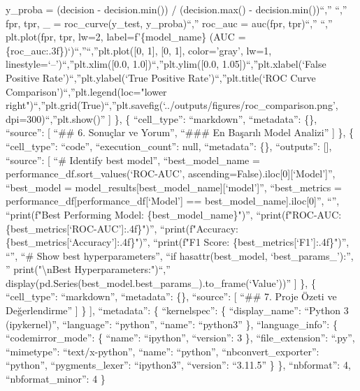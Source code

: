 \documentclass[11pt]{article}
\begin{document}
y\_proba = (decision - decision.min()) / (decision.max() -
decision.min())\n``,'' \n``,'' fpr, tpr, \_ = roc\_curve(y\_test,
y\_proba)\n``,'' roc\_auc = auc(fpr, tpr)\n``,'' \n``,'' plt.plot(fpr,
tpr, lw=2, label=f'\{model\_name\} (AUC =
\{roc\_auc:.3f\})`)\n``,''\n``,''plt.plot({[}0, 1{]}, {[}0, 1{]},
color='gray', lw=1, linestyle=`--')\n``,''plt.xlim({[}0.0,
1.0{]})\n``,''plt.ylim({[}0.0, 1.05{]})\n``,''plt.xlabel(`False Positive
Rate')\n``,''plt.ylabel(`True Positive Rate')\n``,''plt.title(`ROC Curve
Comparison')\n``,''plt.legend(loc="lower
right")\n``,''plt.grid(True)\n``,''plt.savefig(`../outputs/figures/roc\_comparison.png',
dpi=300)\n``,''plt.show()'' {]} \}, \{ ``cell\_type'': ``markdown'',
``metadata'': \{\}, ``source'': {[} ``\#\# 6. Sonuçlar ve Yorum\n'',
``\#\#\# En Başarılı Model Analizi'' {]} \}, \{ ``cell\_type'':
``code'', ``execution\_count'': null, ``metadata'': \{\}, ``outputs'':
{[}{]}, ``source'': {[} ``\# Identify best model\n'',
``best\_model\_name = performance\_df.sort\_values(`ROC-AUC',
ascending=False).iloc{[}0{]}{[}`Model'{]}\n'', ``best\_model =
model\_results{[}best\_model\_name{]}{[}`model'{]}\n'', ``best\_metrics
= performance\_df{[}performance\_df{[}`Model'{]} ==
best\_model\_name{]}.iloc{[}0{]}\n'', ``\n'', ``print(f"Best Performing
Model: \{best\_model\_name\}")\n'', ``print(f"ROC-AUC:
\{best\_metrics{[}`ROC-AUC'{]}:.4f\}")\n'', ``print(f"Accuracy:
\{best\_metrics{[}`Accuracy'{]}:.4f\}")\n'', ``print(f"F1 Score:
\{best\_metrics{[}`F1'{]}:.4f\}")\n'', ``\n'', ``\# Show best
hyperparameters\n'', ``if hasattr(best\_model, `best\_params\_'):\n'',
'' print("\textbackslash nBest Hyperparameters:")\n``,''
display(pd.Series(best\_model.best\_params\_).to\_frame(`Value'))'' {]}
\}, \{ ``cell\_type'': ``markdown'', ``metadata'': \{\}, ``source'': {[}
``\#\# 7. Proje Özeti ve Değerlendirme'' {]} \} {]}, ``metadata'': \{
``kernelspec'': \{ ``display\_name'': ``Python 3 (ipykernel)'',
``language'': ``python'', ``name'': ``python3'' \}, ``language\_info'':
\{ ``codemirror\_mode'': \{ ``name'': ``ipython'', ``version'': 3 \},
``file\_extension'': ``.py'', ``mimetype'': ``text/x-python'', ``name'':
``python'', ``nbconvert\_exporter'': ``python'', ``pygments\_lexer'':
``ipython3'', ``version'': ``3.11.5'' \} \}, ``nbformat'': 4,
``nbformat\_minor'': 4 \}


    
    
    
\end{document}
